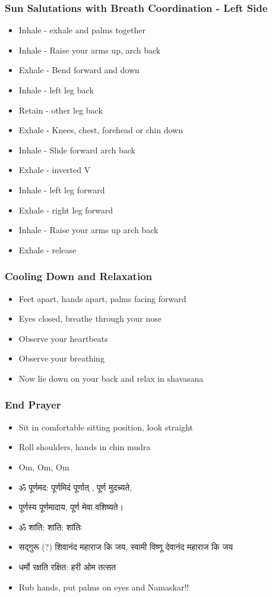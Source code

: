 \begin{frame}[fragile]\frametitle{Sun Salutations with Breath Coordination - Left Side}
\begin{itemize}
    \item Inhale - exhale and palms together
    \item Inhale - Raise your arms up, arch back
    \item Exhale - Bend forward and down
    \item Inhale - left leg back
    \item Retain - other leg back
    \item Exhale - Knees, chest, forehead or chin down
    \item Inhale - Slide forward arch back
    \item Exhale - inverted V
    \item Inhale - left leg forward
    \item Exhale - right leg forward
    \item Inhale - Raise your arms up arch back
    \item Exhale - release
\end{itemize}
\end{frame}

\begin{frame}[fragile]\frametitle{Cooling Down and Relaxation}
\begin{itemize}
    \item Feet apart, hands apart, palms facing forward
    \item Eyes closed, breathe through your nose
    \item Observe your heartbeats
    \item Observe your breathing
    \item Now lie down on your back and relax in shavasana
\end{itemize}
\end{frame}

\begin{frame}[fragile]\frametitle{End Prayer}
\begin{itemize}
    \item Sit in comfortable sitting position, look straight
    \item Roll shoulders, hands in chin mudra
    \item Om, Om, Om
    \item ॐ पूर्णमद: पूर्णमिदं पूर्णात् , पूर्ण मुदच्यते, 
    \item पूर्णस्य पूर्णमादाय, पूर्ण मेवा वशिष्यते। 
    \item ॐ शांति: शांति: शांतिः
    \item सद्गुरू (?) शिवानंद महाराज कि जय, स्वामी विष्णू देवानंद महाराज कि जय 
    \item धर्मो रक्षति रक्षित: हरी ओम तत्सत 
    \item Rub hands, put palms on eyes and Namaskar!!
\end{itemize}
\end{frame}
